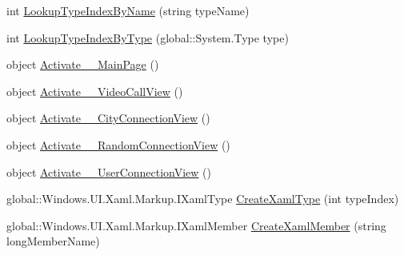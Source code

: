 \begin{DoxyCompactItemize}
int \hyperlink{class_e_l_i_client_1_1_e_l_i_client___xaml_type_info_1_1_xaml_type_info_provider_a3009bbb11c7cd77c0b2150ce8b2f1e83}{Lookup\+Type\+Index\+By\+Name} (string type\+Name)
\item 
int \hyperlink{class_e_l_i_client_1_1_e_l_i_client___xaml_type_info_1_1_xaml_type_info_provider_aef061eccf423d6179a7445e6a886268a}{Lookup\+Type\+Index\+By\+Type} (global\+::\+System.\+Type type)
\item 
object \hyperlink{class_e_l_i_client_1_1_e_l_i_client___xaml_type_info_1_1_xaml_type_info_provider_a4f5ed7fa109803ca4e77895515eb3c86}{Activate\+\_\+\_\+\+Main\+Page} ()
\item 
object \hyperlink{class_e_l_i_client_1_1_e_l_i_client___xaml_type_info_1_1_xaml_type_info_provider_a12923c75d1e077e681c27f80787699e6}{Activate\+\_\+\_\+\+Video\+Call\+View} ()
\item 
object \hyperlink{class_e_l_i_client_1_1_e_l_i_client___xaml_type_info_1_1_xaml_type_info_provider_a594a49912d4b1f94fbafdfecd8bcbdb7}{Activate\+\_\+\_\+\+City\+Connection\+View} ()
\item 
object \hyperlink{class_e_l_i_client_1_1_e_l_i_client___xaml_type_info_1_1_xaml_type_info_provider_a9dbfe6cbda6a19d2f569449928dd45bc}{Activate\+\_\+\_\+\+Random\+Connection\+View} ()
\item 
object \hyperlink{class_e_l_i_client_1_1_e_l_i_client___xaml_type_info_1_1_xaml_type_info_provider_a1df3c01fa00c7a6f4ace46ca59e699ab}{Activate\+\_\+\_\+\+User\+Connection\+View} ()
\item 
global\+::\+Windows.\+U\+I.\+Xaml.\+Markup.\+I\+Xaml\+Type \hyperlink{class_e_l_i_client_1_1_e_l_i_client___xaml_type_info_1_1_xaml_type_info_provider_afb9c01c2dd724369db4dcbbf42424ec0}{Create\+Xaml\+Type} (int type\+Index)
\item 
global\+::\+Windows.\+U\+I.\+Xaml.\+Markup.\+I\+Xaml\+Member \hyperlink{class_e_l_i_client_1_1_e_l_i_client___xaml_type_info_1_1_xaml_type_info_provider_abf3f2757986c5f7240025456fa57b28a}{Create\+Xaml\+Member} (string long\+Member\+Name)
\end{DoxyCompactItemize}
